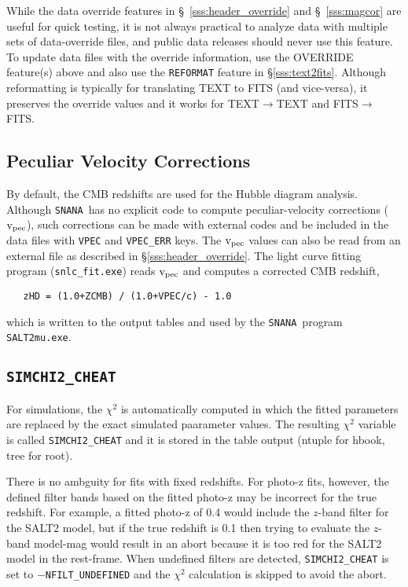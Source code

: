 \documentclass[12pt]{article}
\newcommand{\snana}{{\tt SNANA}}
\newcommand{\vpec}{{\rm v}_{\rm pec}}
\begin{document}
While the data override features in 
\S~\ref{sss:header_override} and \S~\ref{sss:magcor}
are useful for quick testing, it is not always practical to 
analyze data with multiple sets of data-override files,
and public data releases should never use this feature.
To update data files with the override information,
use the OVERRIDE feature(s) above and also
use the {\tt REFORMAT} feature in \S\ref{sss:text2fits}.
Although reformatting is typically for translating TEXT to FITS
(and vice-versa), it preserves the override values and
it works for TEXT$\to$TEXT and FITS$\to$FITS. 

\subsection{Peculiar Velocity Corrections }
\label{subsec:vpec}

By default, the CMB redshifts are used for the Hubble diagram
analysis. Although \snana\ has no explicit code to compute
peculiar-velocity corrections ($\vpec$), such corrections
can be made with external codes and be included in the data files
with {\tt VPEC} and {\tt VPEC\_ERR} keys. The $\vpec$ values
can also be read from an external file as described in 
\S\ref{sss:header_override}. The light curve fitting program
({\tt snlc\_fit.exe}) reads $\vpec$ and computes a corrected
CMB redshift,
\begin{verbatim}
   zHD = (1.0+ZCMB) / (1.0+VPEC/c) - 1.0 
\end{verbatim}
which is written to the output tables and used by the \snana\ program
{\tt SALT2mu.exe}.



\subsection{{\tt SIMCHI2\_CHEAT} }
\label{subsec:simchi2_chear}

For simulations, the $\chi^2$ is automatically computed
in which the fitted parameters are replaced by the 
exact simulated paarameter values. The resulting $\chi^2$ variable
is called {\tt SIMCHI2\_CHEAT} and it is stored in the 
table output (ntuple for hbook, tree for root).

There is no ambguity for fits with fixed redshifts.
For photo-z fits, however, the defined filter bands based
on the fitted photo-z may be incorrect for the true redshift.
For example, a fitted photo-z of 0.4 would include the
$z$-band filter for the SALT2 model, 
but if the true redshift is 0.1 then trying to evaluate
the $z$-band model-mag would result in an abort because
it is too red for the SALT2 model in the rest-frame.
When undefined filters are detected,
{\tt SIMCHI2\_CHEAT}  is set to $-${\tt NFILT\_UNDEFINED}
and the $\chi^2$ calculation is skipped to avoid the abort.
\end{document}
